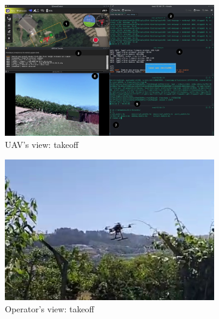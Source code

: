 \begin{figure}[!hbt]
  \centering
  \begin{subfigure}[t]{\textwidth}
    \centering
    \includegraphics[width=1.0\textwidth]{./img/png/bao-fpv-insmod-1} 
    \caption{UAV's view: takeoff}%
    \label{fig:mission-exec-sspfs-takeoff-1}
  \end{subfigure}
%  
  \begin{subfigure}[t]{0.49\textwidth}
    \centering
    \includegraphics[width=\linewidth]{./img/png/bao-flight-myView-takeoff}
    \caption{Operator's view: takeoff}%
    \label{fig:mission-exec-sspfs-takeoff-2}
  \end{subfigure}
  \begin{subfigure}[t]{0.49\textwidth}
    \centering

\end{subfigure}
\end{figure}
